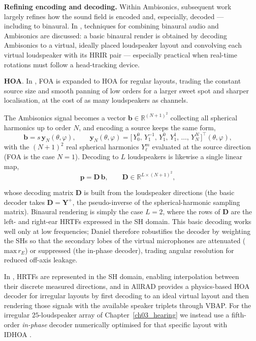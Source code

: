 \textbf{Refining encoding and decoding.}
Within Ambisonics, subsequent work largely refines how the sound field is
encoded and, especially, decoded --- including to binaural. In
\citet{jot1999comparative}, techniques for combining binaural audio and
Ambisonics are discussed: a basic binaural render is obtained by decoding
Ambisonics to a virtual, ideally placed loudspeaker layout and convolving
each virtual loudspeaker with its \acrfull{HRIR} pair --- especially
practical when real-time rotations must follow a head-tracking device.


\textbf{\acrfull{HOA}}. In \citet{daniel2000representation}, \acrshort{FOA} is expanded to
\acrshort{HOA} for regular layouts, trading the constant source size and
smooth panning of low orders for a larger sweet spot and sharper
localisation, at the cost of as many loudspeakers as channels. 

The Ambisonics signal becomes a vector $\mathbf{b}\in\mathbb{R}^{(N+1)^2}$
collecting all spherical harmonics up to order $N$, and encoding a source
keeps the same form,
\begin{equation}
    \mathbf{b} = s\,\mathbf{y}_N(\theta,\varphi), \qquad
    \mathbf{y}_N(\theta,\varphi)=\big[\,Y_0^{0},\,Y_1^{-1},\,Y_1^{0},\,
    Y_1^{1},\,\dots,\,Y_N^{N}\,\big]^{\!\top}\!(\theta,\varphi),
    \label{eq:hoa_encode}
\end{equation}
with the $(N+1)^2$ real spherical harmonics $Y_\ell^{m}$ evaluated at the
source direction (\acrshort{FOA} is the case $N=1$). Decoding to $L$
loudspeakers is likewise a single linear map,
\begin{equation}
    \mathbf{p} = \mathbf{D}\,\mathbf{b}, \qquad
    \mathbf{D}\in\mathbb{R}^{L\times(N+1)^2},
    \label{eq:hoa_decode}
\end{equation}

whose decoding matrix $\mathbf{D}$ is built from the loudspeaker directions
(the basic decoder takes $\mathbf{D}=\mathbf{Y}^{+}$, the pseudo-inverse of
the spherical-harmonic sampling matrix). Binaural rendering is simply
the case $L=2$, where the rows of $\mathbf{D}$ are the left- and right-ear
\acrshort{HRTF}s expressed in the \acrshort{SH} domain. This basic decoding works well only at low frequencies; Daniel therefore
robustifies the decoder by weighting the \acrshort{SH}s so that the secondary
lobes of the virtual microphones are attenuated ($\mathrm{max}\,r_E$) or
suppressed (the in-phase decoder), trading angular resolution for reduced
off-axis leakage.

In \citet{avni2010sound}, \acrshort{HRTF}s are represented in the
\acrshort{SH} domain, enabling interpolation between their discrete
measured directions, and in \citet{zotter2012all} AllRAD provides
a physics-based \acrshort{HOA} decoder for irregular layouts by first
decoding to an ideal virtual layout and then rendering those signals with the available speaker triplets through
\acrshort{VBAP}. For the irregular $25$-loudspeaker array of
Chapter~\ref{ch03_hearing} we instead use a fifth-order \emph{in-phase} decoder
numerically optimised for that specific layout with IDHOA
\citep{scaini2014decoding}.

